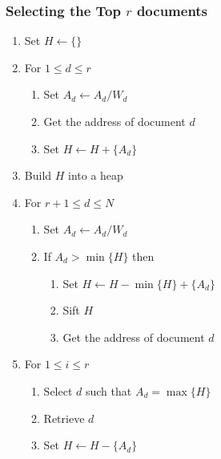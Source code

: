 \documentclass[svgnames]{beamer}
\newcommand{\att}{\ensuremath{\leftarrow}}
\begin{document}
\begin{frame}
  \frametitle{Selecting the Top $r$ documents}
  
  \begin{enumerate}
  \item Set $H \att \{\}$
  \item For $1 \leq d \leq r$
    \begin{enumerate}
    \item Set $A_d \att A_d/W_d$
    \item Get the address of document $d$
    \item Set $H \att H + \{A_d\}$
    \end{enumerate}
  \item Build $H$ into a heap
  \item For $r + 1 \leq d \leq N$
    \begin{enumerate}
    \item Set $A_d \att A_d/W_d$
    \item If $A_d > \min\{H\}$ then
      \begin{enumerate}
      \item Set $H \att H - \min\{H\} + \{A_d\}$
      \item Sift $H$
      \item Get the address of document $d$
      \end{enumerate}
    \end{enumerate}
  \item For $1 \leq i \leq r$
    \begin{enumerate}
    \item Select $d$ such that $A_d = \max\{H\}$
    \item Retrieve $d$
    \item Set $H \att H - \{A_d\}$
    \end{enumerate}
  \end{enumerate}
\end{frame}

\end{document}
